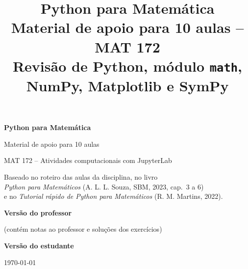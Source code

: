 

\title{\sffamily\bfseries\color{azul} Python para Matemática\\[6pt]
  \Large\mdseries Material de apoio para 10 aulas -- MAT 172\\[4pt]
  \large Revisão de Python, módulo \texttt{math}, NumPy, Matplotlib e SymPy}
\author{}
\date{}


\frontmatter
\begin{titlepage}
  \centering
  \vspace*{2cm}
  {\sffamily\bfseries\color{azul}\fontsize{34}{40}\selectfont Python para Matemática\par}
  \vspace{0.6cm}
  {\sffamily\Large Material de apoio para 10 aulas\par}
  \vspace{0.3cm}
  {\sffamily\large MAT 172 -- Atividades computacionais com JupyterLab\par}
  \vspace{1.5cm}
  \vspace{1.5cm}

  {\large Baseado no roteiro das aulas da disciplina, no livro\\
  \emph{Python para Matemáticos} (A. L. L. Souza, SBM, 2023, cap.~3 a 6)\\
  e no \emph{Tutorial rápido de Python para Matemáticos} (R. M. Martins, 2022).\par}
  \vfill
  \ifprofessor
    {\sffamily\bfseries\color{vermelho} Versão do professor\par}
    {\small (contém notas ao professor e soluções dos exercícios)\par}
  \else
    {\sffamily\bfseries\color{azul} Versão do estudante\par}
  \fi
  \vspace{0.5cm}
  {\large \today\par}
\end{titlepage}


\tableofcontents

\mainmatter











\appendix


\ifprofessor
  
\fi

\backmatter


